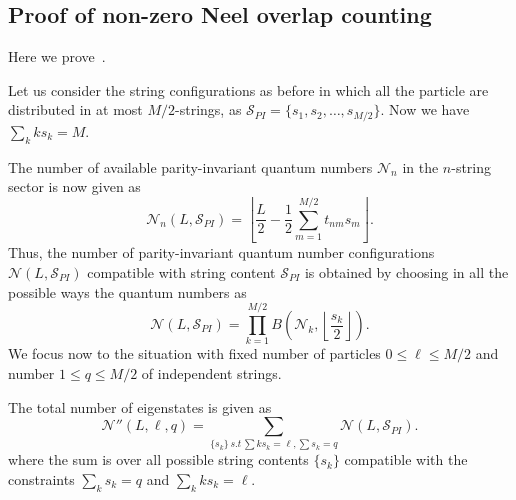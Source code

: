 \documentclass[11pt]{iopart}
\begin{document}
\subsection{Proof of non-zero Neel overlap counting}

Here we prove~. 

Let us consider the string configurations as before in which all the particle are 
distributed in at most $M/2$-strings, as ${\mathcal S}_{PI}=\{s_1,s_2,\dots,s_{M/2}\}$. 
Now we have $\sum_k ks_k=M$. 

The number of available parity-invariant quantum numbers ${\mathcal N}_n$ in the 
$n$-string sector is now given as 
%
\begin{equation}
{\mathcal N}_n(L,{\mathcal S}_{PI})=\left\lfloor\frac{L}{2}-\frac{1}{2}
\sum_{m=1}^{M/2}t_{nm}s_m\right\rfloor.
\end{equation}
%
Thus, the number of parity-invariant quantum number configurations ${\mathcal N}(L,{\mathcal 
S}_{PI})$ compatible with string content ${\mathcal S}_{PI}$ is obtained by choosing in 
all the possible ways the quantum numbers as  
%
\begin{equation}
{\mathcal N}(L,{\mathcal S}_{PI})=\prod_{k=1}^{M/2} B\left({\mathcal N}_k,\left\lfloor\frac{s_k}{2}
\right\rfloor\right).
\end{equation}
%
We focus now to the situation with fixed number of particles $0\le\ell\le M/2$ and number 
$1\le q\le M/2$ of independent strings. 

The total number of eigenstates is given as 
%
\begin{equation}
\label{eqq}
{\mathcal N}''(L,\ell,q)=\sum\limits_{\{s_k\}\,s.t\, \sum k s_k=\ell, \sum s_k=q}{\mathcal N}(L,
{\mathcal S}_{PI}).
\end{equation}
%
where the sum is over all possible string contents $\{s_k\}$ compatible with the constraints 
$\sum_k s_k=q$ and $\sum_k k s_k=\ell$. 
\end{document}
